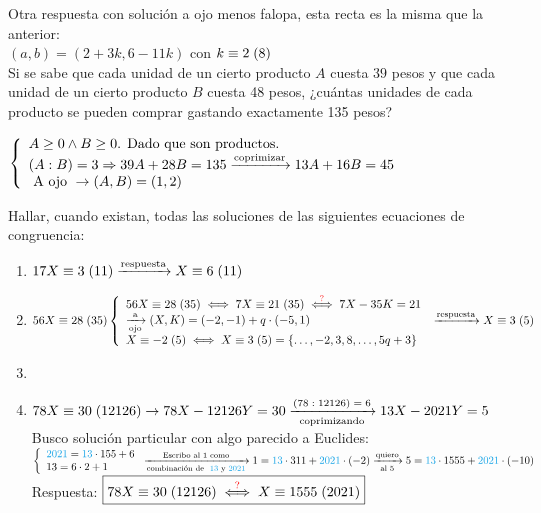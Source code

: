\documentclass[12pt,a4paper, spanish]{article}
\begin{document}
\noindent Otra respuesta con solución a ojo menos falopa, esta recta es la misma que la anterior:\\
$(a,b) = (2+3k, 6-11k)$ con $k \equiv 2 \;(8) $\\

\ejercicio
Si se sabe que cada unidad de un cierto producto $A$ cuesta $39$ pesos y que cada unidad de un cierto
producto $B$ cuesta 48 pesos, ¿cuántas unidades de cada producto se pueden comprar gastando exactamente
135 pesos?

\separadorCorto

$
	\llave{l}{
		A \geq 0 \y B \geq 0 \text{. Dado que son productos.}\\
		(A:B) = 3 \entonces 39A + 28B = 135
		\flecha{coprimizar}
		13A + 16B = 45\\
		\text{ A ojo } \to (A,B) = (1,2)
	}
$

\ejercicio
Hallar, cuando existan, todas las soluciones de las siguientes ecuaciones de congruencia:

\separadorCorto

\begin{enumerate}[label=\roman*)]
	\item $\congruencia{17X}{3}{11} \flecha{respuesta} \congruencia{X}{6}{11} $\\

	\item $\congruencia{56X}{28}{35}\\
		      \llave{l}{
			      \congruencia{56X}{28}{35} \sisolosi
			      \congruencia{7X}{21}{35} \stackrel{\red{?}}\sisolosi
			      7X - 35K = 21\\
			      \flecha{a}[ojo] (X,K) = (-2,-1) + q \cdot (-5, 1)\\
			      \congruencia{X}{-2}{5} \sisolosi \congruencia{X}{3}{5} = \set{\dots, -2, 3, 8, \dots, 5q+3}
		      }\\
		      \flecha{respuesta} \congruencia{X}{3}{5} $

	\item
	\item $\congruencia{78X}{30}{12126}  \to 78X - 12126 Y = 30 \flecha{$(78:12126) = 6$}[coprimizando] 13X - 2021 Y = 5$\\
	      Busco solución particular con algo parecido a Euclides:\\
	      $\llave{l}{
			      \blue{2021} =  \blue{13} \cdot 155 + 6\\
			      13 =  6 \cdot 2 + 1
		      }\flecha{Escribo al 1 como}[combinación de \blue{13} y\blue{2021}]
		      1 = \blue{13} \cdot 311 + \blue{2021} \cdot (-2)
		      \flecha{quiero}[al 5]
		      5 =  \blue{13}\cdot 1555 + \blue{2021} \cdot (-10)$\\

	      Respuesta: $\boxed{78X \equiv 30 \;(12126)
			      \stackrel{{\color{red}\text{?}}} {\iff} X \equiv 1555 \;(2021)}$

\end{enumerate}
\end{document}
